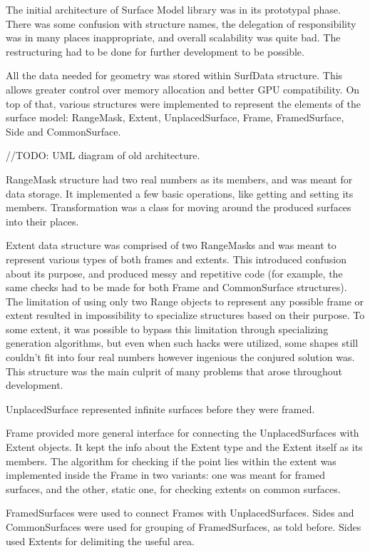 \documentclass[12pt, a4paper]{article}
\begin{document}
The initial architecture of Surface Model library was in its prototypal phase. There was some confusion with structure names, the delegation of responsibility was in many places inappropriate, and overall scalability was quite bad. The restructuring had to be done for further development to be possible.

All the data needed for geometry was stored within SurfData structure. This allows greater control over memory allocation and better GPU compatibility. On top of that, various structures were implemented to represent the elements of the surface model: RangeMask, Extent, UnplacedSurface, Frame, FramedSurface, Side and CommonSurface.

//TODO: UML diagram of old architecture.

RangeMask structure had two real numbers as its members, and was meant for data storage. It implemented a few basic operations, like getting and setting its members. Transformation was a class for moving around the produced surfaces into their places.

Extent data structure was comprised of two RangeMasks and was meant to represent various types of both frames and extents. This introduced confusion about its purpose, and produced messy and repetitive code (for example, the same checks had to be made for both Frame and CommonSurface structures). The limitation of using only two Range objects to represent any possible frame or extent resulted in impossibility to specialize structures based on their purpose. To some extent, it was possible to bypass this limitation through specializing generation algorithms, but even when such hacks were utilized, some shapes still couldn't fit into four real numbers however ingenious the conjured solution was. This structure was the main culprit of many problems that arose throughout development.

UnplacedSurface represented infinite surfaces before they were framed.

Frame provided more general interface for connecting the UnplacedSurfaces with Extent objects. It kept the info about the Extent type and the Extent itself as its members. The algorithm for checking if the point lies within the extent was implemented inside the Frame in two variants: one was meant for framed surfaces, and the other, static one, for checking extents on common surfaces.

FramedSurfaces were used to connect Frames with UnplacedSurfaces. Sides and CommonSurfaces were used for grouping of FramedSurfaces, as told before. Sides used Extents for delimiting the useful area.
\end{document}
